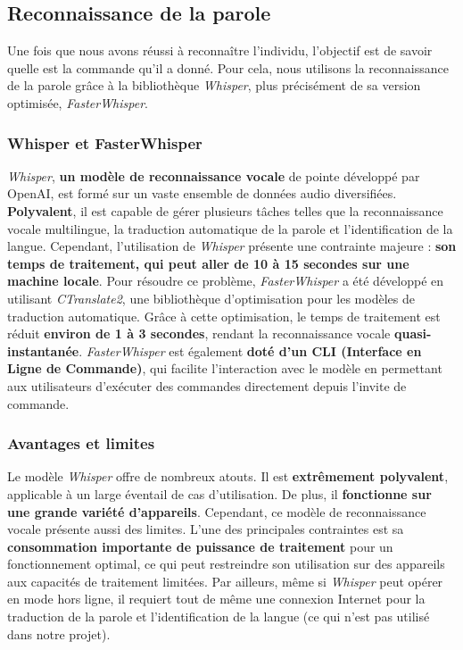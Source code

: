 \subsection{Reconnaissance de la parole}
\label{subsec:Reconnaissance_parole}

Une fois que nous avons réussi à reconnaître l'individu, l'objectif est de
savoir quelle est la commande qu'il a donné. Pour cela, nous utilisons la
reconnaissance de la parole grâce à la bibliothèque \textit{Whisper}, plus
précisément de sa version optimisée, \textit{FasterWhisper}.

\subsubsection*{Whisper et FasterWhisper}

\textit{Whisper}, \textbf{un modèle de reconnaissance vocale} de pointe développé par OpenAI, est formé sur un vaste ensemble de données audio diversifiées. \textbf{Polyvalent}, il est
capable de gérer plusieurs tâches telles que la reconnaissance vocale multilingue, la traduction automatique de la parole et l'identification de la langue.
Cependant, l'utilisation de \textit{Whisper} présente une contrainte majeure : \textbf{son temps de traitement, qui peut aller de 10 à 15 secondes sur une machine locale}.
Pour résoudre ce problème, \textit{FasterWhisper} a été développé en utilisant
\textit{CTranslate2}, une bibliothèque d'optimisation pour les modèles de
traduction automatique. Grâce à cette optimisation, le temps de
	traitement est réduit \textbf{environ de 1 à 3 secondes}, rendant la reconnaissance vocale \textbf{quasi-instantanée}.
\textit{FasterWhisper} est également \textbf{doté d'un CLI (Interface en Ligne de Commande)}, qui facilite l'interaction avec le modèle en permettant aux utilisateurs d'exécuter des commandes directement depuis
l'invite de commande.

\subsubsection*{Avantages et limites}

Le modèle \textit{Whisper} offre de nombreux atouts. Il est \textbf{extrêmement
	polyvalent}, applicable à un large éventail de cas d'utilisation. De plus, il
\textbf{fonctionne sur une grande variété d'appareils}. Cependant, ce modèle de
reconnaissance vocale présente aussi des limites. L'une des principales
contraintes est sa \textbf{consommation importante de puissance de traitement}
pour un fonctionnement optimal, ce qui peut restreindre son utilisation sur des
appareils aux capacités de traitement limitées. Par ailleurs, même si
\textit{Whisper} peut opérer en mode hors ligne, il requiert tout de même une
connexion Internet pour la traduction de la parole et l'identification de la
langue (ce qui n'est pas utilisé dans notre projet).

